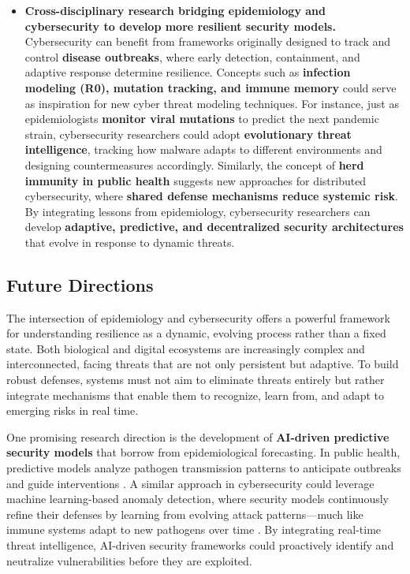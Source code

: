 \documentclass{article}
\begin{document}
\begin{itemize}
    \item \textbf{Cross-disciplinary research bridging epidemiology and cybersecurity to develop more resilient security models.}  
    Cybersecurity can benefit from frameworks originally designed to track and control \textbf{disease outbreaks}, where early detection, containment, and adaptive response determine resilience. Concepts such as \textbf{infection modeling (R0), mutation tracking, and immune memory} could serve as inspiration for new cyber threat modeling techniques. For instance, just as epidemiologists \textbf{monitor viral mutations} to predict the next pandemic strain, cybersecurity researchers could adopt \textbf{evolutionary threat intelligence}, tracking how malware adapts to different environments and designing countermeasures accordingly. Similarly, the concept of \textbf{herd immunity in public health} suggests new approaches for distributed cybersecurity, where \textbf{shared defense mechanisms reduce systemic risk}. By integrating lessons from epidemiology, cybersecurity researchers can develop \textbf{adaptive, predictive, and decentralized security architectures} that evolve in response to dynamic threats.
\end{itemize}


\subsection{Future Directions}
The intersection of epidemiology and cybersecurity offers a powerful framework for understanding resilience as a dynamic, evolving process rather than a fixed state. Both biological and digital ecosystems are increasingly complex and interconnected, facing threats that are not only persistent but adaptive. To build robust defenses, systems must not aim to eliminate threats entirely but rather integrate mechanisms that enable them to recognize, learn from, and adapt to emerging risks in real time.

One promising research direction is the development of \textbf{AI-driven predictive security models} that borrow from epidemiological forecasting. In public health, predictive models analyze pathogen transmission patterns to anticipate outbreaks and guide interventions \citep{morens2020emerging}. A similar approach in cybersecurity could leverage machine learning-based anomaly detection, where security models continuously refine their defenses by learning from evolving attack patterns—much like immune systems adapt to new pathogens over time \citep{schmid2014antigenic}. By integrating real-time threat intelligence, AI-driven security frameworks could proactively identify and neutralize vulnerabilities before they are exploited.
\end{document}
